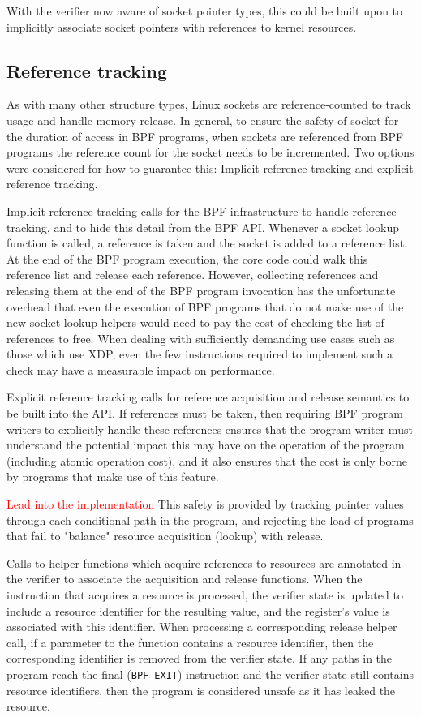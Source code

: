 \documentclass[10pt,sigconf,authorversion]{lpc}
\newcommand\todo[1]{\textcolor{red}{#1}}
\begin{document}
With the verifier now aware of socket pointer types, this could be built upon
to implicitly associate socket pointers with references to kernel resources.

\subsection{Reference tracking}

As with many other structure types, Linux sockets are reference-counted to
track usage and handle memory release. In general, to ensure the safety of
socket for the duration of access in BPF programs, when sockets are referenced
from BPF programs the reference count for the socket needs to be incremented.
Two options were considered for how to guarantee this: Implicit reference
tracking and explicit reference tracking.

Implicit reference tracking calls for the BPF infrastructure to handle
reference tracking, and to hide this detail from the BPF API. Whenever a socket
lookup function is called, a reference is taken and the socket is added to a
reference list. At the end of the BPF program execution, the core code could
walk this reference list and release each reference. However, collecting
references and releasing them at the end of the BPF program invocation has the
unfortunate overhead that even the execution of BPF programs that do not make
use of the new socket lookup helpers would need to pay the cost of checking the
list of references to free. When dealing with sufficiently demanding use cases
such as those which use XDP, even the few instructions required to implement
such a check may have a measurable impact on performance.

Explicit reference tracking calls for reference acquisition and release
semantics to be built into the API. If references must be taken, then requiring
BPF program writers to explicitly handle these references ensures that the
program writer must understand the potential impact this may have on the
operation of the program (including atomic operation cost), and it also ensures
that the cost is only borne by programs that make use of this feature.

\todo{Lead into the implementation} This safety is provided by tracking pointer
values through each conditional path in the program, and rejecting the load of
programs that fail to "balance" resource acquisition (lookup) with release.

Calls to helper functions which acquire references to resources are annotated
in the verifier to associate the acquisition and release functions. When the
instruction that acquires a resource is processed, the verifier state is
updated to include a resource identifier for the resulting value, and the
register's value is associated with this identifier. When processing a
corresponding release helper call, if a parameter to the function contains a
resource identifier, then the corresponding identifier is removed from the
verifier state. If any paths in the program reach the final (\verb+BPF_EXIT+)
instruction and the verifier state still contains resource identifiers, then
the program is considered unsafe as it has leaked the resource.
\end{document}
